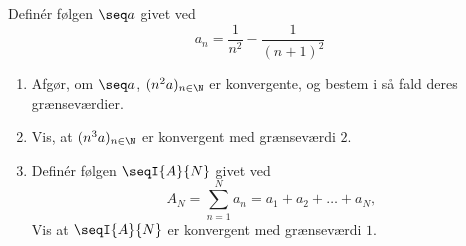 \begin{opg}
Definér følgen $\seq a$ givet ved
    $$ a_n = \frac{1}{n^2} - \frac{1}{(n+1)^2} $$
\begin{enumerate}
    \item Afgør, om $\seq a$, $(n^2a)_{n\in \N}$ er konvergente, og bestem i så fald deres grænseværdier.
    
    
    
    \item Vis, at $(n^3a)_{n\in\N}$ er konvergent med grænseværdi $2$.
    
    \item Definér følgen $\seqI{A}{N}$ givet ved
    $$ A_N = \sum_{n=1}^N a_n = a_1 + a_2 + \ldots + a_N, $$
    Vis at $\seqI{A}{N}$ er konvergent med grænseværdi $1$.
\end{enumerate}
\end{opg}

